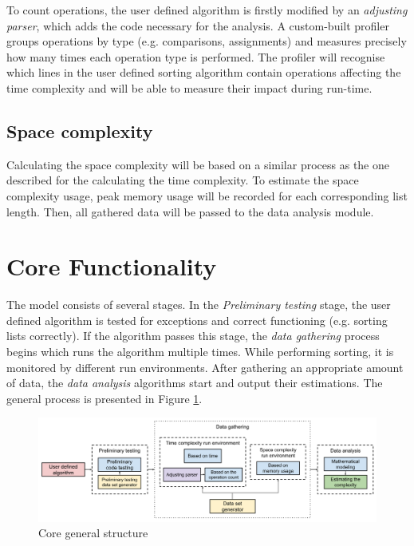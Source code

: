 \documentclass{article}
\begin{document}
                To count operations, the user defined algorithm is firstly modified by an \textit{adjusting parser}, which adds the code necessary for the analysis. A custom-built profiler groups operations by type (e.g. comparisons, assignments) and measures precisely how many times each operation type is performed. The profiler will recognise which lines in the user defined sorting algorithm contain operations affecting the time complexity and will be able to measure their impact during run-time.

            
            \subsection{Space complexity}
                Calculating the space complexity will be based on a similar process as the one described for the calculating the time complexity. To estimate the space complexity usage, peak memory usage will be recorded for each corresponding list length. Then, all gathered data will be passed to the data analysis module. 

\newpage
    \section{Core Functionality} \label{corefunc}
        The model consists of several stages. In the \textit{Preliminary testing} stage, the user defined algorithm is tested for exceptions and correct functioning (e.g. sorting lists correctly). If the algorithm passes this stage, the \textit{data gathering} process begins which runs the algorithm multiple times. While performing sorting, it is monitored by different run environments. After gathering an appropriate amount of data, the \textit{data analysis} algorithms start and output their estimations. The general process is presented in Figure \ref{fig:core structure}.
            
        \begin{figure}[H]
        \includegraphics[width=1.0\textwidth]{model_diagram.png}
        \caption{Core general structure}
        \label{fig:core structure}
        \end{figure}
    
\end{document}
